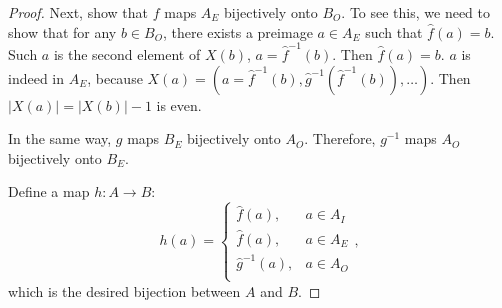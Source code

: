 \begin{proof}
    Next, show that $f$ maps $A_E$ bijectively onto $B_O$. To see this, we need to show that for any $b \in B_O$, there exists a preimage $a \in A_E$ such that $\widehat{f}(a) = b$. Such $a$ is the second element of $X(b)$, $a = \widehat{f}^{-1}(b)$. Then $\widehat{f}(a) = b$. $a$ is indeed in $A_E$, because $X(a) = (a = \widehat{f}^{-1}(b), \widehat{g}^{-1}(\widehat{f}^{-1}(b)), \ldots)$. Then $|X(a)| = |X(b)| - 1$ is even.

    In the same way, $g$ maps $B_E$ bijectively onto $A_O$. Therefore, $g^{-1}$ maps $A_O$ bijectively onto $B_E$.

    Define a map $h : A \to B$:
    \begin{equation}
        h(a) = 
        \begin{cases}
            \widehat{f}(a), & a \in A_I \\
            \widehat{f}(a), & a \in A_E \\
            \widehat{g}^{-1}(a), & a \in A_O \\
        \end{cases},
    \end{equation}
    which is the desired bijection between $A$ and $B$.
\end{proof}